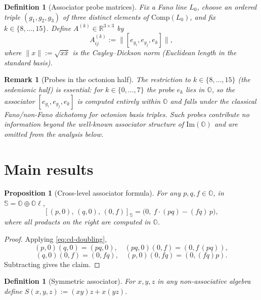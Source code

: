\documentclass[12pt,a4paper]{article}
\newtheorem{proposition}[theorem]{Proposition}
\newtheorem{definition}[theorem]{Definition}
\newtheorem{remark}[theorem]{Remark}
\begin{document}
\begin{definition}[Associator probe matrices]
Fix a Fano line $L_0$, choose an ordered triple $(g_1,g_2,g_3)$ of three distinct elements of $\mathrm{Comp}(L_0)$, and fix $k\in\{8,\dots,15\}$.
Define $A^{(k)}\in\mathbb{R}^{3\times 3}$ by
\begin{equation}\label{eq:Adef}
A^{(k)}_{ij}:=\bigl\|[e_{g_i},e_{g_j},e_k]\bigr\|,
\end{equation}
where $\|x\|:=\sqrt{x\bar x}$ is the Cayley--Dickson norm (Euclidean length in the standard basis).
\end{definition}

\begin{remark}[Probes in the octonion half]
\label{rem:octonion-half}
The restriction to $k \in \{8, \ldots, 15\}$ (the sedenionic half) is essential: for $k \in \{0, \ldots, 7\}$ the probe $e_k$ lies in $\mathbb{O}$, so the associator $[e_{g_i}, e_{g_j}, e_k]$ is computed entirely within $\mathbb{O}$ and falls under the classical Fano/non-Fano dichotomy for octonion basis triples. Such probes contribute no information beyond the well-known associator structure of $\mathrm{Im}(\mathbb{O})$ and are omitted from the analysis below.
\end{remark}

\section{Main results}\label{sec:main}

\begin{proposition}[Cross-level associator formula]
\label{prop:cross-assoc}
For any $p, q, f \in \mathbb{O}$, in $\mathbb{S} = \mathbb{O} \oplus \mathbb{O}\ell$,
\[
  [(p,0),\,(q,0),\,(0,f)]_{\mathbb{S}} = \bigl(0,\ f\cdot(pq) - (f q)\, p\bigr),
\]
where all products on the right are computed in $\mathbb{O}$.
\end{proposition}

\begin{proof}
Applying \eqref{eq:cd-doubling},
\[
  (p,0)(q,0) = (pq, 0), \quad
  (pq,0)(0,f) = (0, f\,(pq)),
\]
\[
  (q,0)(0,f) = (0, fq), \quad
  (p,0)(0, fq) = (0, (fq)p).
\]
Subtracting gives the claim.
\end{proof}

\begin{definition}[Symmetric associator]
For $x, y, z$ in any non-associative algebra define
$S(x,y,z) := (xy)z + x(yz).$
\end{definition}
\end{document}
